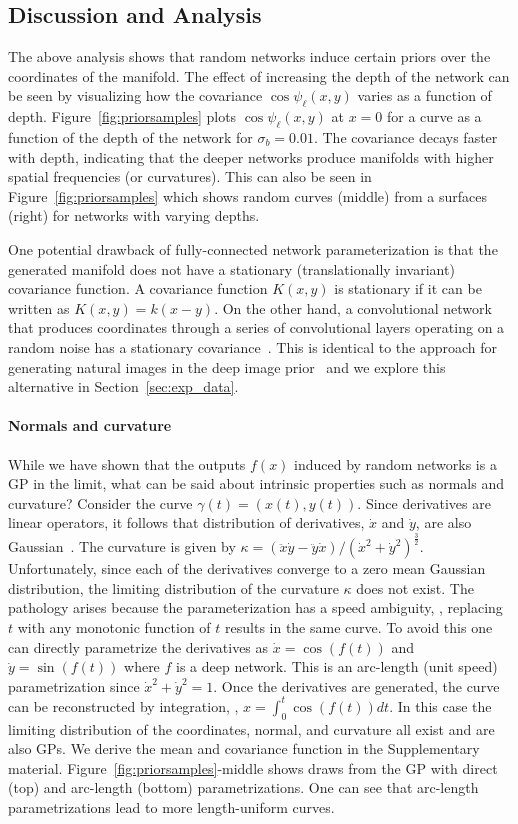 \subsection{Discussion and Analysis}
The above analysis shows that random networks induce certain priors
over the coordinates of the manifold. 
The effect of increasing the depth of the network can be seen by
visualizing how the covariance 
$\cos \psi_\ell (x, y)$ varies as a function of depth.
Figure~\ref{fig:priorsamples} plots $\cos \psi_\ell (x, y)$
at $x=0$ for a curve as a function of the depth of the network for
$\sigma_b=0.01$.
The covariance decays faster with depth, indicating
that the deeper networks produce manifolds with higher spatial frequencies (or curvatures).
This can also be seen in Figure~\ref{fig:priorsamples} which shows random curves (middle) from a
surfaces (right) for networks with varying depths. 

One potential drawback of fully-connected network parameterization is that the
generated manifold does not have a stationary (translationally invariant) covariance function. 
A covariance function $K(x,y)$ is stationary if it can be written as
$K(x,y) = k(x-y)$. 
On the other hand, a convolutional network that produces coordinates through a series of convolutional layers operating on
a random noise has a stationary covariance~\cite{cheng2019bayesian}. 
This is identical to the approach for generating natural images in the
deep image prior~\cite{dip} and we explore this alternative in Section~\ref{sec:exp_data}.

\paragraph*{Normals and curvature} While we have shown that the outputs $f(x)$ induced by
random networks is a GP in the limit, what can be said about intrinsic properties
such as normals and curvature? 
Consider the curve $\gamma(t) = (x(t), y(t))$. 
Since derivatives are linear operators, it follows that 
distribution of derivatives, $\dot{x}$ and $\dot{y}$, are also Gaussian~\cite{solak2003derivative}.
The curvature is given by $\kappa = (\ddot{x}\dot{y} - \ddot{y}\dot{x})/(\dot{x}^2 + \dot{y}^2)^\frac{3}{2}.$
Unfortunately, since each of the derivatives converge to a zero mean
Gaussian distribution, the limiting distribution of the curvature $\kappa$ does
not exist. 
The pathology arises because the parameterization has a
speed ambiguity, \ie, replacing $t$
with any monotonic function of $t$ results in the same curve. 
To avoid this one can directly parametrize the derivatives as $\dot{x} =
\cos(f(t))$ and $\dot{y} = \sin(f(t))$ where $f$ is a deep network.
This is an arc-length (unit speed) parametrization since $\dot{x}^2 + \dot{y}^2 = 1$.
Once the derivatives are generated, the curve can be reconstructed by integration, \ie, $x = \int_0^t \cos(f(t)) dt$.
In this case the limiting distribution of the coordinates, normal, and
curvature all exist and are also GPs. We derive the mean and
covariance function in the Supplementary material.
Figure~\ref{fig:priorsamples}-middle shows draws from the GP with direct (top) and arc-length (bottom) parametrizations. 
One can see that arc-length parametrizations lead to more length-uniform curves.

